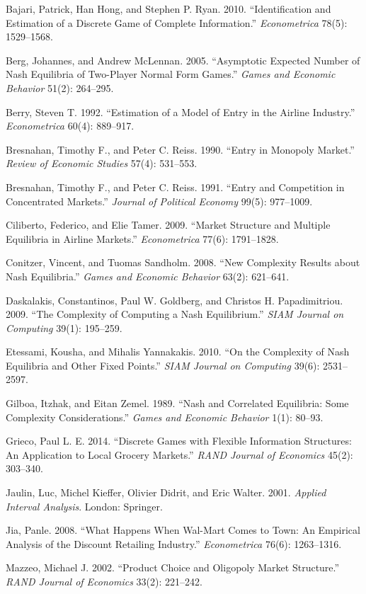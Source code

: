 \documentclass[11pt]{article}
\begin{document}
Bajari, Patrick, Han Hong, and Stephen P. Ryan. 2010. ``Identification
and Estimation of a Discrete Game of Complete Information.''
\emph{Econometrica} 78(5): 1529--1568.

Berg, Johannes, and Andrew McLennan. 2005. ``Asymptotic Expected Number
of Nash Equilibria of Two-Player Normal Form Games.'' \emph{Games and
Economic Behavior} 51(2): 264--295.

Berry, Steven T. 1992. ``Estimation of a Model of Entry in the Airline
Industry.'' \emph{Econometrica} 60(4): 889--917.

Bresnahan, Timothy F., and Peter C. Reiss. 1990. ``Entry in Monopoly
Market.'' \emph{Review of Economic Studies} 57(4): 531--553.

Bresnahan, Timothy F., and Peter C. Reiss. 1991. ``Entry and Competition
in Concentrated Markets.'' \emph{Journal of Political Economy} 99(5):
977--1009.

Ciliberto, Federico, and Elie Tamer. 2009. ``Market Structure and
Multiple Equilibria in Airline Markets.'' \emph{Econometrica} 77(6):
1791--1828.

Conitzer, Vincent, and Tuomas Sandholm. 2008. ``New Complexity Results
about Nash Equilibria.'' \emph{Games and Economic Behavior} 63(2):
621--641.

Daskalakis, Constantinos, Paul W. Goldberg, and Christos H.
Papadimitriou. 2009. ``The Complexity of Computing a Nash Equilibrium.''
\emph{SIAM Journal on Computing} 39(1): 195--259.

Etessami, Kousha, and Mihalis Yannakakis. 2010. ``On the Complexity of
Nash Equilibria and Other Fixed Points.'' \emph{SIAM Journal on
Computing} 39(6): 2531--2597.

Gilboa, Itzhak, and Eitan Zemel. 1989. ``Nash and Correlated Equilibria:
Some Complexity Considerations.'' \emph{Games and Economic Behavior}
1(1): 80--93.

Grieco, Paul L. E. 2014. ``Discrete Games with Flexible Information
Structures: An Application to Local Grocery Markets.'' \emph{RAND
Journal of Economics} 45(2): 303--340.

Jaulin, Luc, Michel Kieffer, Olivier Didrit, and Eric Walter. 2001.
\emph{Applied Interval Analysis}. London: Springer.

Jia, Panle. 2008. ``What Happens When Wal-Mart Comes to Town: An
Empirical Analysis of the Discount Retailing Industry.''
\emph{Econometrica} 76(6): 1263--1316.

Mazzeo, Michael J. 2002. ``Product Choice and Oligopoly Market
Structure.'' \emph{RAND Journal of Economics} 33(2): 221--242.
\end{document}
